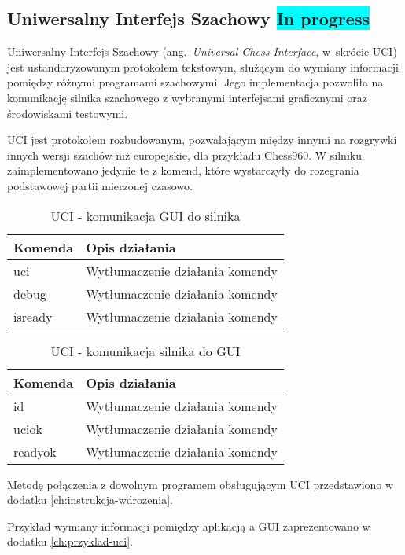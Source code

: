 \subsection{Uniwersalny Interfejs Szachowy \colorbox{cyan}{In progress}}
\label{subsec:interfejs-szachowy}

Uniwersalny Interfejs Szachowy (ang.~\emph{Universal Chess Interface}, w~skrócie UCI) jest ustandaryzowanym protokołem tekstowym, służącym do wymiany informacji pomiędzy różnymi programami szachowymi.
Jego implementacja pozwoliła na komunikację silnika szachowego z wybranymi interfejsami graficznymi oraz środowiskami testowymi.

UCI jest protokołem rozbudowanym, pozwalającym między innymi na rozgrywki innych wersji szachów niż europejskie, dla przykładu Chess960.
W silniku zaimplementowano jedynie te z komend, które wystarczyły do rozegrania podstawowej partii mierzonej czasowo.


\begin{table}[htb] \small
\centering
\caption{UCI - komunikacja GUI do silnika}
\label{tab:UCI_GUI_silnik}
\begin{tabularx}{\linewidth}{|p{.25\linewidth}|X|}\hline
    Komenda & Opis działania \\ \hline\hline

    uci & Wytłumaczenie działania komendy \\ \hline
    debug & Wytłumaczenie działania komendy \\ \hline
    isready & Wytłumaczenie działania komendy \\ \hline
\end{tabularx}
\end{table}

\begin{table}[htb] \small
\centering
\caption{UCI - komunikacja silnika do GUI}
\label{tab:UCI_silnik_GUI}
\begin{tabularx}{\linewidth}{|p{.25\linewidth}|X|}\hline
Komenda & Opis działania \\ \hline\hline

id & Wytłumaczenie działania komendy \\ \hline
uciok & Wytłumaczenie działania komendy \\ \hline
readyok & Wytłumaczenie działania komendy \\ \hline
\end{tabularx}
\end{table}

Metodę połączenia z dowolnym programem obsługującym UCI przedstawiono w dodatku \ref{ch:instrukcja-wdrozenia}.

Przykład wymiany informacji pomiędzy aplikacją a GUI zaprezentowano w dodatku \ref{ch:przyklad-uci}.